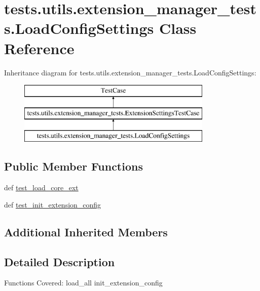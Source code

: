 \hypertarget{classtests_1_1utils_1_1extension__manager__tests_1_1LoadConfigSettings}{\section{tests.\-utils.\-extension\-\_\-manager\-\_\-tests.\-Load\-Config\-Settings Class Reference}
\label{classtests_1_1utils_1_1extension__manager__tests_1_1LoadConfigSettings}
}
Inheritance diagram for tests.\-utils.\-extension\-\_\-manager\-\_\-tests.\-Load\-Config\-Settings\-:\begin{figure}[H]
\begin{center}
\leavevmode
\includegraphics[height=3.000000cm]{classtests_1_1utils_1_1extension__manager__tests_1_1LoadConfigSettings}
\end{center}
\end{figure}
\subsection*{Public Member Functions}
\begin{DoxyCompactItemize}
\item 
def \hyperlink{classtests_1_1utils_1_1extension__manager__tests_1_1LoadConfigSettings_a6a030c80c178c3d3f0ca0ad4603121c1}{test\-\_\-load\-\_\-core\-\_\-ext}
\item 
def \hyperlink{classtests_1_1utils_1_1extension__manager__tests_1_1LoadConfigSettings_ad545de88fc2f5eba813161fa4cb31d83}{test\-\_\-init\-\_\-extension\-\_\-config}
\end{DoxyCompactItemize}
\subsection*{Additional Inherited Members}


\subsection{Detailed Description}
\begin{DoxyVerb}Functions Covered:
  load_all
  init_extension_config\end{DoxyVerb}
 

